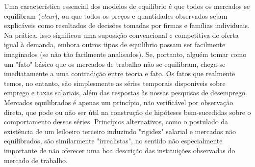 \documentclass[12pt]{article}
\begin{document}
Uma característica essencial dos modelos de equilíbrio é que todos os mercados se equilibram (\textit{clear}), ou que todos os preços e quantidades observados sejam explicáveis como resultados de decisões tomadas por firmas e famílias individuais. Na prática, isso significou uma suposição convencional e competitiva de oferta igual à demanda, embora outros tipos de equilíbrio possam ser facilmente imaginados (se não tão facilmente analisados). Se, portanto, alguém tomar como um "fato" básico que os mercados de trabalho não se equilibram, chega-se imediatamente a uma contradição entre teoria e fato. Os fatos que realmente temos, no entanto, são simplesmente as séries temporais disponíveis sobre emprego e taxas salariais, além das respostas às nossas pesquisas de desemprego. Mercados equilibrados é apenas um princípio, não verificável por observação direta, que pode ou não ser útil na construção de hipóteses bem-sucedidas sobre o comportamento dessas séries. Princípios alternativos, como o postulado da existência de um leiloeiro terceiro induzindo "rigidez" salarial e mercados não equilibrados, são similarmente "irrealistas", no sentido não especialmente importante de não oferecer uma boa descrição das instituições observadas do mercado de trabalho.
\end{document}
